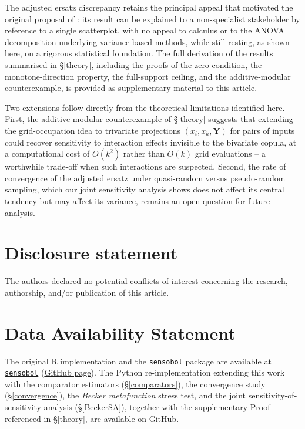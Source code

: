 \documentclass[12pt]{article}
\begin{document}
The adjusted ersatz discrepancy retains the principal appeal that motivated the original proposal of \citet{puy2024discrepancy}: its result can be explained to a non-specialist stakeholder by reference to a single scatterplot, with no appeal to calculus or to the ANOVA decomposition underlying variance-based methods, while still resting, as shown here, on a rigorous statistical foundation. The full derivation of the results summarised in \S\ref{theory}, including the proofs of the zero condition, the monotone-direction property, the full-support ceiling, and the additive-modular counterexample, is provided as supplementary material to this article.

Two extensions follow directly from the theoretical limitations identified here. First, the additive-modular counterexample of \S\ref{theory} suggests that extending the grid-occupation idea to trivariate projections $(x_i, x_k, \bm Y)$ for pairs of inputs could recover sensitivity to interaction effects invisible to the bivariate copula, at a computational cost of $O(k^2)$ rather than $O(k)$ grid evaluations -- a worthwhile trade-off when such interactions are suspected. Second, the rate of convergence of the adjusted ersatz under quasi-random versus pseudo-random sampling, which our joint sensitivity analysis shows does not affect its central tendency but may affect its variance, remains an open question for future analysis.

\section*{Disclosure statement}

The authors declared no potential conflicts of interest concerning the research, authorship, and/or publication of this article.

\section*{Data Availability Statement}

The original R implementation and the \texttt{sensobol} package are available at \href{https://cran.r-project.org/web/packages/sensobol/refman/sensobol.html}{\texttt{sensobol}} (\href{https://github.com/arnaldpuy/sensobol}{GitHub page}). The Python re-implementation extending this work with the comparator estimators (\S\ref{comparators}), the convergence study (\S\ref{convergence}), the \textit{Becker metafunction} stress test, and the joint sensitivity-of-sensitivity analysis (\S\ref{BeckerSA}), together with the supplementary Proof referenced in \S\ref{theory}, are available on GitHub.
\end{document}
